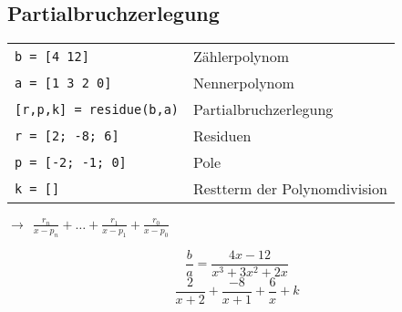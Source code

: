 \subsection{Partialbruchzerlegung}
\begin{minipage}{10cm}
  \begin{tabular}{ll}
    \verb?b = [4 12]? & Zählerpolynom \\
    \verb?a = [1 3 2 0]? & Nennerpolynom \\
    \verb?[r,p,k] = residue(b,a)? & Partialbruchzerlegung \\
    \verb?r = [2; -8; 6]? & Residuen \\
    \verb?p = [-2; -1; 0]? & Pole \\
    \verb?k = []? & Restterm der Polynomdivision
  \end{tabular} \newline
  $ \rightarrow ~~ \frac{r_n}{x - p_n} + \ldots + \frac{r_1}{x - p_1} +
  \frac{r_0}{x - p_0} $
\end{minipage}
\begin{minipage}{8cm}
  $$ \frac{b}{a} = \frac{4x -12}{x^3 + 3x^2 + 2x} $$
  \newline
  $$ \frac{2}{x+2} + \frac{-8}{x+1} + \frac{6}{x} + k$$
\end{minipage}
